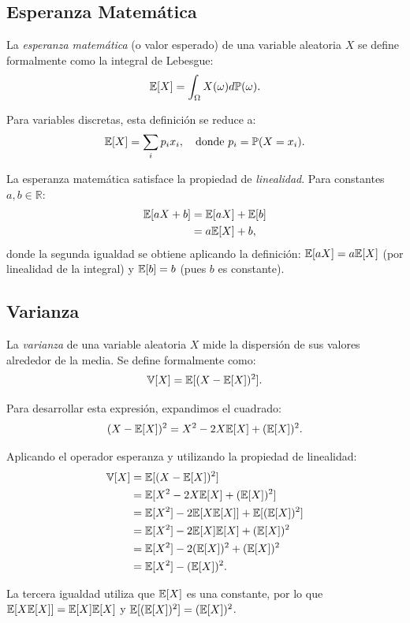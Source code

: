 \subsection*{Esperanza Matemática}

La \textit{esperanza matemática} (o valor esperado) de una variable aleatoria $X$ se define formalmente como la integral de Lebesgue:
\[
\mathbb{E}[X] = \int_{\Omega} X(\omega) d\mathbb{P}(\omega).
\]

Para variables discretas, esta definición se reduce a:
\[
\mathbb{E}[X] = \sum_{i} p_i x_i, \quad \text{donde } p_i = \mathbb{P}(X = x_i).
\]

La esperanza matemática satisface la propiedad de \textit{linealidad}. Para constantes $a, b \in \mathbb{R}$:
\begin{align*}
\mathbb{E}[aX + b] &= \mathbb{E}[aX] + \mathbb{E}[b]\\
            &= a\mathbb{E}[X] + b,
\end{align*}
donde la segunda igualdad se obtiene aplicando la definición: $\mathbb{E}[aX] = a\mathbb{E}[X]$ (por linealidad de la integral) y $\mathbb{E}[b] = b$ (pues $b$ es constante).

\subsection*{Varianza}

La \textit{varianza} de una variable aleatoria $X$ mide la dispersión de sus valores alrededor de la media. Se define formalmente como:
\[
\mathbb{V}[X] = \mathbb{E}[(X - \mathbb{E}[X])^2].
\]

Para desarrollar esta expresión, expandimos el cuadrado:
\[
(X - \mathbb{E}[X])^2 = X^2 - 2X\mathbb{E}[X] + (\mathbb{E}[X])^2.
\]

Aplicando el operador esperanza y utilizando la propiedad de linealidad:
\begin{align*}
\mathbb{V}[X] &= \mathbb{E}[(X - \mathbb{E}[X])^2]\\
      &= \mathbb{E}[X^2 - 2X\mathbb{E}[X] + (\mathbb{E}[X])^2]\\
      &= \mathbb{E}[X^2] - 2\mathbb{E}[X\mathbb{E}[X]] + \mathbb{E}[(\mathbb{E}[X])^2]\\
      &= \mathbb{E}[X^2] - 2\mathbb{E}[X]\mathbb{E}[X] + (\mathbb{E}[X])^2\\
      &= \mathbb{E}[X^2] - 2(\mathbb{E}[X])^2 + (\mathbb{E}[X])^2\\
      &= \mathbb{E}[X^2] - (\mathbb{E}[X])^2.
\end{align*}

La tercera igualdad utiliza que $\mathbb{E}[X]$ es una constante, por lo que $\mathbb{E}[X\mathbb{E}[X]] = \mathbb{E}[X]\mathbb{E}[X]$ y $\mathbb{E}[(\mathbb{E}[X])^2] = (\mathbb{E}[X])^2$.

